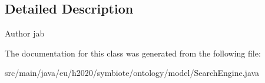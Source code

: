 \subsection{Detailed Description}
\begin{DoxyAuthor}{Author}
jab 
\end{DoxyAuthor}


The documentation for this class was generated from the following file\+:\begin{DoxyCompactItemize}
\item 
src/main/java/eu/h2020/symbiote/ontology/model/Search\+Engine.\+java\end{DoxyCompactItemize}
